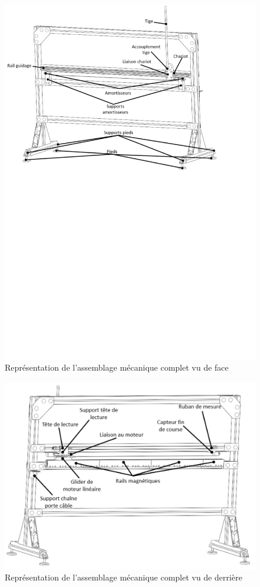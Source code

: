 \begin{figure}[H]
  \centering
  \includegraphics[width = \textwidth]{assets/figures/AssemblageCompletFace.svg}
  \caption{Représentation de l'assemblage mécanique complet vu de face}
  \label{fig:AssCompFace}
\end{figure}

\begin{figure}[H]
  \centering
  \includegraphics[width = \textwidth]{assets/figures/AssemblageCompletDerriere.svg}
  \caption{Représentation de l'assemblage mécanique complet vu de derrière}
  \label{fig:AssCompDerriere}
\end{figure}